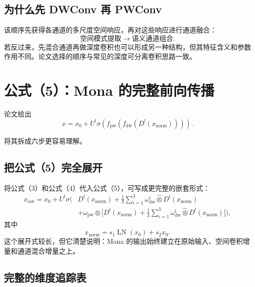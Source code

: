 \documentclass[UTF8,12pt,a4paper,fontset=none]{ctexart}
\newcommand{\LN}{\operatorname{LN}}
\begin{document}
\subsection{为什么先 DWConv 再 PWConv}

该顺序先获得各通道的多尺度空间响应，再对这些响应进行通道融合：
\begin{equation}
 \text{空间模式提取}\longrightarrow\text{语义通道组合}.
\end{equation}
若反过来，先混合通道再做深度卷积也可以形成另一种结构，但其特征含义和参数作用不同。论文选择的顺序与常见的深度可分离卷积思路一致。

\section{公式（5）：Mona 的完整前向传播}

论文给出
\begin{equation}
 x
 =x_0+U^l\sigma\left(
 f_{\mathrm{pw}}\left(
 f_{\mathrm{dw}}\left(
 D^l(x_{\mathrm{norm}})
 \right)
 \right)
 \right).
 \tag{5}
\end{equation}

将其拆成六步更容易理解。



\subsection{把公式（5）完全展开}

将公式（3）和公式（4）代入公式（5），可写成更完整的嵌套形式：
\begin{align}
 x_{\mathrm{out}}
 =x_0+U^l\sigma\Bigg(&D^l(x_{\mathrm{norm}})
 +\frac{1}{3}\sum_{i=1}^{3}
 \omega_{\mathrm{dw}}^i\widehat{\otimes}D^l(x_{\mathrm{norm}})\\
 &+\omega_{\mathrm{pw}}\otimes
 \Big[D^l(x_{\mathrm{norm}})
 +\frac{1}{3}\sum_{i=1}^{3}
 \omega_{\mathrm{dw}}^i\widehat{\otimes}D^l(x_{\mathrm{norm}})\Big]
 \Bigg),
\end{align}
其中
\begin{equation}
 x_{\mathrm{norm}}=s_1\LN(x_0)+s_2x_0.
\end{equation}
这个展开式较长，但它清楚说明：Mona 的输出始终建立在原始输入、空间卷积增量和通道混合增量之上。

\subsection{完整的维度追踪表}
\end{document}
